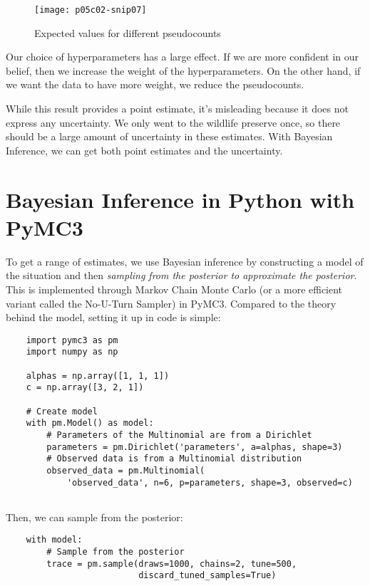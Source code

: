 \begin{figure*}[h]
    \texttt{[image: p05c02-snip07]}
    \caption{Expected values for different pseudocounts}
\end{figure*}

Our choice of hyperparameters has a large effect. If we are more confident in our belief, then we increase the weight of the hyperparameters. On the other hand, if we want the data to have more weight, we reduce the pseudocounts.

While this result provides a point estimate, it's misleading because it does not express any uncertainty. We only went to the wildlife preserve once, so there should be a large amount of uncertainty in these estimates. With Bayesian Inference, we can get both point estimates and the uncertainty.

\section{Bayesian Inference in Python with PyMC3}

To get a range of estimates, we use Bayesian inference by constructing a model of the situation and then \textit{sampling from the posterior to approximate the posterior}. This is implemented through Markov Chain Monte Carlo (or a more efficient variant called the No-U-Turn Sampler) \cite{Hoffman:2014:NSA:2627435.2638586} in PyMC3. Compared to the theory behind the model, setting it up in code is simple:


\begin{lstlisting}
    import pymc3 as pm
    import numpy as np
    
    alphas = np.array([1, 1, 1])
    c = np.array([3, 2, 1])
    
    # Create model
    with pm.Model() as model:
        # Parameters of the Multinomial are from a Dirichlet
        parameters = pm.Dirichlet('parameters', a=alphas, shape=3)
        # Observed data is from a Multinomial distribution
        observed_data = pm.Multinomial(
            'observed_data', n=6, p=parameters, shape=3, observed=c)   
    
\end{lstlisting}

Then, we can sample from the posterior:

\begin{lstlisting}
    with model:
        # Sample from the posterior
        trace = pm.sample(draws=1000, chains=2, tune=500, 
                          discard_tuned_samples=True)
\end{lstlisting}

